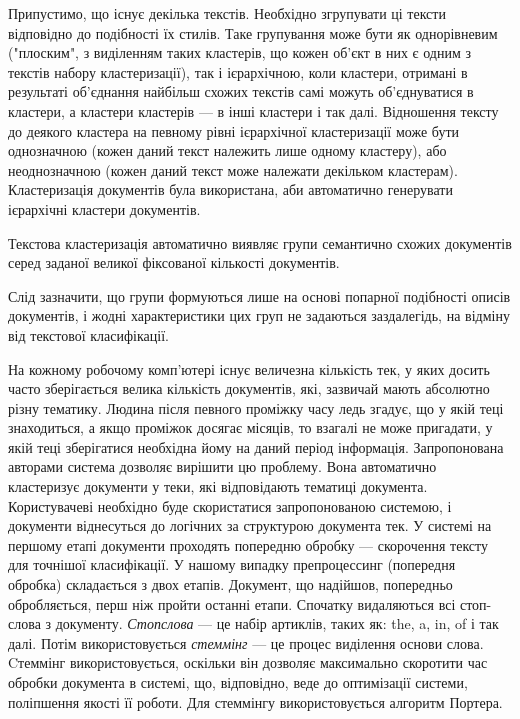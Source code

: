 Припустимо, що існує декілька текстів. Необхідно згрупувати ці тексти відповідно до подібності їх стилів. Таке групування може бути як однорівневим ("плоским", з виділенням таких кластерів, що кожен об'єкт в них є одним з текстів набору кластеризації), так і ієрархічною, коли кластери, отримані в результаті об'єднання найбільш схожих текстів самі можуть об'єднуватися в кластери, а кластери кластерів — в інші кластери і так далі. Відношення тексту до деякого кластера на певному рівні ієрархічної кластеризації може бути однозначною (кожен даний текст належить лише одному кластеру), або неоднозначною (кожен даний текст може належати декільком кластерам). Кластеризація документів була використана, аби автоматично генерувати ієрархічні кластери документів.

Текстова кластеризація автоматично виявляє групи семантично схожих документів серед заданої великої фіксованої кількості документів.

Слід зазначити, що групи формуються лише на основі попарної подібності описів документів, і жодні характеристики цих груп не задаються заздалегідь, на відміну від текстової класифікації.

На кожному робочому комп'ютері існує величезна кількість тек, у яких досить часто зберігається велика кількість документів, які, зазвичай мають абсолютно різну тематику. Людина після певного проміжку часу ледь згадує, що у якій теці знаходиться, а якщо проміжок досягає місяців, то взагалі не може пригадати, у якій теці зберігатися необхідна йому на даний період інформація. Запропонована авторами система дозволяє вирішити цю проблему. Вона автоматично кластеризує документи у теки, які відповідають тематиці документа. Користувачеві необхідно буде скористатися запропонованою системою, і документи віднесуться до логічних за структурою документа тек. У системі на першому етапі документи проходять попередню обробку — скорочення тексту для точнішої класифікації. У нашому випадку препроцессинг (попередня обробка) складається з двох етапів. Документ, що надійшов, попередньо обробляється, перш ніж пройти останні етапи. Спочатку видаляються всі стоп-слова з документу. \textit{Стопслова} — це набір артиклів, таких як: the, a, in, of і так далі. Потім використовується \textit{стеммінг} — це процес виділення основи слова. Cтеммінг використовується, оскільки він дозволяє максимально скоротити час обробки документа в системі, що, відповідно, веде до оптимізації системи, поліпшення якості її роботи. Для стеммінгу використовується алгоритм Портера.


